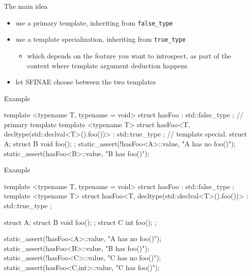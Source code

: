 \begin{frame}[fragile]
  \begin{block}{The main idea}
    \begin{itemize}
    \item use a primary template, inheriting from \texttt{false_type}
    \item use a template specialization, inheriting from \texttt{true_type}
    \begin{itemize}
      \item which depends on the feature you want to introspect,
            as part of the context where template argument deduction happens
    \end{itemize}
    \item let SFINAE choose between the two templates
    \end{itemize}
  \end{block}
  \begin{exampleblock}{Example}
    \small
    \begin{cppcode*}{}
      template <typename T, typename = void>
      struct hasFoo : std::false_type {}; // primary template
      template <typename T>
      struct hasFoo<T, decltype(std::declval<T>().foo())>
        : std::true_type {};              // template special.
      struct A{}; struct B{ void foo(); };
      static_assert(!hasFoo<A>::value, "A has no foo()");
      static_assert(hasFoo<B>::value, "B has foo()");
    \end{cppcode*}
  \end{exampleblock}
\end{frame}

\begin{frame}[fragile]
  \begin{exampleblock}{Example}
    \small
    \begin{cppcode*}{}
      template <typename T, typename = void>
      struct hasFoo : std::false_type {};
      template <typename T>
      struct hasFoo<T, decltype(std::declval<T>().foo())>
        : std::true_type {};

      struct A{};
      struct B{ void foo(); };
      struct C{ int  foo(); };

      static_assert(!hasFoo<A>::value, "A has no foo()");
      static_assert(hasFoo<B>::value, "B has foo()");
      static_assert(!hasFoo<C>::value, "C has no foo()");
      static_assert(hasFoo<C,int>::value, "C has foo()");
    \end{cppcode*}
  \end{exampleblock}
\end{frame}

